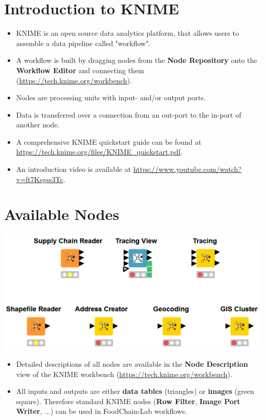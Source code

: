 \documentclass{beamer}
\begin{document}
\section{Introduction to KNIME}
\begin{frame}
	\begin{itemize}
		\item KNIME is an open source data analytics platform, that allows users to assemble a data pipeline called "workflow".
		\item A workflow is built by dragging nodes from the \textbf{Node Repository} onto the \textbf{Workflow Editor} and connecting them (\url{https://tech.knime.org/workbench}).
		\item Nodes are processing units with input- and/or output ports.
		\item Data is transferred over a connection from an out-port to the in-port of another node.
		\item A comprehensive KNIME quickstart guide can be found at \url{https://tech.knime.org/files/KNIME_quickstart.pdf}.
		\item An introduction video is available at \url{https://www.youtube.com/watch?v=ft7Ksgss3Tc}.
	\end{itemize}
\end{frame}

\section{Available Nodes}
\begin{frame}
	\begin{center}
  		\includegraphics[height=0.4\textheight]{1.png}
	\end{center}
	\begin{itemize}
		\item Detailed descriptions of all nodes are available in the \textbf{Node Description} view of the KNIME workbench (\url{https://tech.knime.org/workbench}).
		\item All inputs and outputs are either \textbf{data tables} (triangles) or \textbf{images} (green square). Therefore standard KNIME nodes (\textbf{Row Filter}, \textbf{Image Port Writer}, ...) can be used in FoodChain-Lab workflows.		
	\end{itemize}
\end{frame}
 
\end{document}
